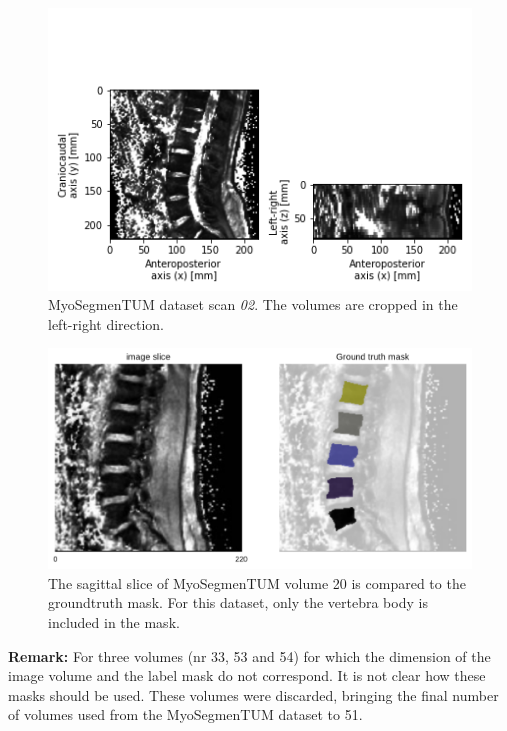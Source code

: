 \begin{figure}
    \centering
    \includegraphics[width=.95\textwidth]{automated_graphs/OSF_02.png}
    \caption{MyoSegmenTUM dataset scan \textit{02}. 
    The volumes are cropped in the left-right direction. 
    \label{fig:OSF_02}}
\end{figure}

\begin{figure}
    \centering
    \includegraphics[width=.95\textwidth]{images/MyoSegmenTUM020_s21_mask.pdf}
    \caption{The sagittal slice of MyoSegmenTUM volume 20 is compared to the \Gls{groundtruth} mask.
    For this dataset, only the vertebra body is included in the mask. 
    \protect
    }
\end{figure}

\textbf{Remark:} For three volumes (nr 33, 53 and 54) for which the dimension of the image volume and the label mask do not correspond. 
It is not clear how these masks should be used. 
These volumes were discarded, bringing the final number of volumes used from the MyoSegmenTUM dataset to 51.